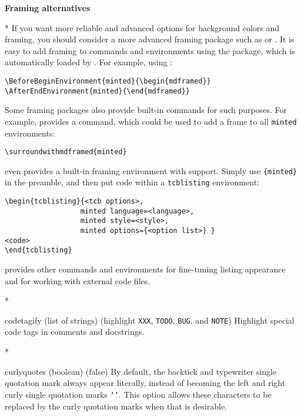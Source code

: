 \begin{paracol}{2}
\begin{optionlist}
\textbf{Framing alternatives}
\switchcolumn

\switchcolumn[0]*%
If you want more reliable and advanced options for background colors and framing, you should consider a more advanced framing package such as  or .  It is easy to add framing to  commands and environments using the  package, which is automatically loaded by .  For example, using :
\begin{Verbatim}
\BeforeBeginEnvironment{minted}{\begin{mdframed}}
\AfterEndEnvironment{minted}{\end{mdframed}}
\end{Verbatim}
Some framing packages also provide built-in commands for such purposes.  For example,  provides a \texttt{\string\surroundwithmdframed} command, which could be used to add a frame to all \texttt{minted} environments:
\begin{Verbatim}
\surroundwithmdframed{minted}
\end{Verbatim}
 even provides a built-in framing environment with  support.  Simply use \texttt{\string\tcbuselibrary\{minted\}} in the preamble, and then put code within a \texttt{tcblisting} environment:
\begin{Verbatim}
\begin{tcblisting}{<tcb options>,
                  minted language=<language>,
                  minted style=<style>,
                  minted options={<option list>} }
<code>
\end{tcblisting}
\end{Verbatim}
 provides other commands and environments for fine-tuning listing appearance and for working with external code files.
\switchcolumn

\switchcolumn[0]*%
  \item[codetagify (list of strings) (\textrm{highlight \texttt{XXX}, \texttt{TODO}, \texttt{BUG}, and \texttt{NOTE}})]
    Highlight special code tags in comments and docstrings.
    \switchcolumn

    \switchcolumn[0]*%
\item[curlyquotes (boolean) (false)]
By default, the backtick \texttt{\textasciigrave} and typewriter single quotation mark \texttt{\textquotesingle} always appear literally, instead of becoming the left and right curly single quotation marks \texttt{`'}.  This option allows these characters to be replaced by the curly quotation marks when that is desirable.
\switchcolumn


\end{optionlist}
\end{paracol}
